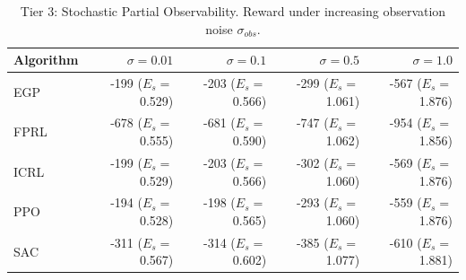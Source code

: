 \begin{table}[h]
\centering
\caption{Tier 3: Stochastic Partial Observability. Reward under increasing observation noise $\sigma_{obs}$.}
\label{tab:tier3-allalgo}
\begin{tabular}{l rrrr}
\toprule
Algorithm & $\sigma={0.01}$ & $\sigma={0.1}$ & $\sigma={0.5}$ & $\sigma={1.0}$ \\
\midrule
EGP & -199 ($E_{s}=$0.529) & -203 ($E_{s}=$0.566) & -299 ($E_{s}=$1.061) & -567 ($E_{s}=$1.876) \\
FPRL & -678 ($E_{s}=$0.555) & -681 ($E_{s}=$0.590) & -747 ($E_{s}=$1.062) & -954 ($E_{s}=$1.856) \\
ICRL & -199 ($E_{s}=$0.529) & -203 ($E_{s}=$0.566) & -302 ($E_{s}=$1.060) & -569 ($E_{s}=$1.876) \\
PPO & -194 ($E_{s}=$0.528) & -198 ($E_{s}=$0.565) & -293 ($E_{s}=$1.060) & -559 ($E_{s}=$1.876) \\
SAC & -311 ($E_{s}=$0.567) & -314 ($E_{s}=$0.602) & -385 ($E_{s}=$1.077) & -610 ($E_{s}=$1.881) \\
\bottomrule
\end{tabular}
\end{table}
